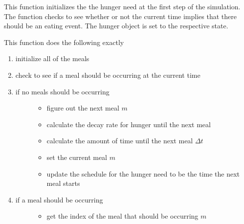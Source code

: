 \documentclass[letterpaper,10pt,english]{sphinxmanual}
\begin{document}
\begin{fulllineitems}
\begin{fulllineitems}
\begin{quote}
\begin{description}
\end{description}\end{quote}

\end{fulllineitems}


\begin{fulllineitems}
\label{hunger:hunger.Hunger.initialize}
This function initializes the the hunger need at the first step of the simulation. The function         checks to see whether or not the current time implies that there should be an eating event. The         hunger object is set to the respective state.

This function does the following exactly
\begin{enumerate}
\item {} 
initialize all of the meals

\item {} 
check to see if a meal should be occurring at the current time

\item {} \begin{description}
\item[{if no meals should be occurring}] \leavevmode\begin{itemize}
\item {} 
figure out the next meal \(m\)

\item {} 
calculate the decay rate for hunger until the next meal

\item {} 
calculate the amount of time until the next meal \(\Delta{t}\)

\item {} 
set the current meal \(m\)

\item {} 
update the schedule for the hunger need to be the time the next meal starts

\end{itemize}

\end{description}

\item {} \begin{description}
\item[{if a meal should be occurring}] \leavevmode\begin{itemize}
\item {} 
get the index of the meal that should be occurring \(m\)


\end{itemize}
\end{description}
\end{enumerate}
\end{fulllineitems}
\end{fulllineitems}
\end{document}
